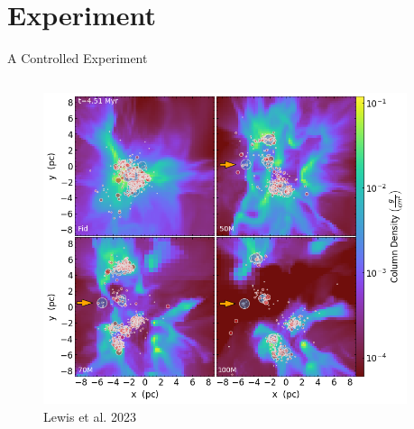 \documentclass[aspectratio=169]{beamer}
\begin{document}
\section{Experiment}
\begin{frame}{A Controlled Experiment}{}
    \begin{columns}
        \begin{column}{0.45\textwidth}
            \begin{figure}[h!]
                \centering
                \includegraphics[width=\linewidth]{../images/density_grid.png} \\
                Lewis et al. 2023
                \label{fig:density}
            \end{figure}
        \end{column}
        \begin{column}{0.35\textwidth}
            

\end{column}
\end{columns}
\end{frame}
\end{document}
